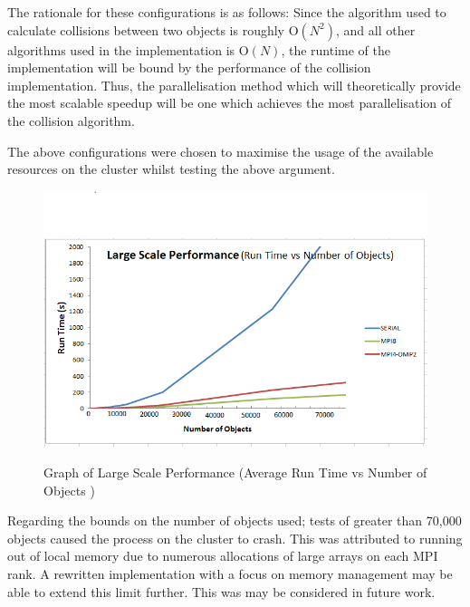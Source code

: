 \documentclass[twoside,twocolumn]{article}
\begin{document}
	The rationale for these configurations is as follows: \newline
	Since the algorithm used to calculate collisions between two objects is roughly O$(N^2)$, and all other algorithms used in the implementation is O$(N)$, the runtime of the implementation will be bound by the performance of the collision implementation. \newline
	Thus, the parallelisation method which will theoretically provide the most scalable speedup will be one which achieves the most parallelisation of the collision algorithm. \newline
		
	The above configurations were chosen to maximise the usage of the available resources on the cluster whilst testing the above argument. \newline
	
	\begin{figure}
		\caption{Graph of Large Scale Performance (Average Run Time vs Number of Objects )}
		\includegraphics[scale=.8]{large.png}
		\label{large}
	\end{figure}
 
	Regarding the bounds on the number of objects used; tests of greater than 70,000 objects caused the process on the cluster to crash. This was attributed to running out of local memory due to numerous allocations of large arrays on each MPI rank. A rewritten implementation with a focus on memory management may be able to extend this limit further. This was may be considered in future work. \newline
	
\end{document}
